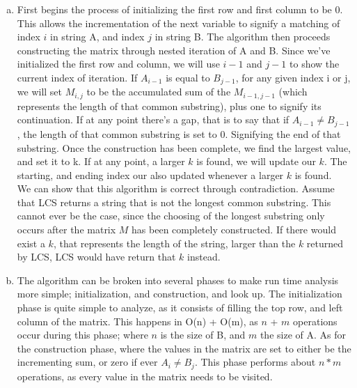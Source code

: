 \documentclass[10pt]{article}
\begin{document}
\begin{question}
\begin{enumerate}[a)]
        \item %
        First begins the process of initializing the first row and first column to be 0. This allows the incrementation of the next variable to signify a matching of index $i$ in string A, and index $j$ in string B.
        \newline \newlie
        The algorithm then proceeds constructing the matrix through nested iteration of A and B. Since we've initialized the first row and column, we will use $i-1$ and $j-1$ to show the current index of iteration. If $A_{i-1}$ is equal to $B_{j-1}$, for any given index i or j, we will set $M_{i,j}$ to be the accumulated sum of the $M_{i-1, j-1}$ (which represents the length of that common substring), plus one to signify its continuation. If at any point there's a gap, that is to say that if $A_{i-1} \neq B_{j-1}$, the length of that common substring is set to 0. Signifying the end of that substring.
        \newline \newline
        Once the construction has been complete, we find the largest value, and set it to k. If at any point, a larger $k$ is found, we will update our $k$. The starting, and ending index our also updated whenever a larger $k$ is found. \
        \newline \newline
        We can show that this algorithm is correct through contradiction. 
        Assume that LCS returns a string that is not the longest common substring. This cannot ever be the case, since the choosing of the longest substring only occurs after the matrix $M$ has been completely constructed. If there would exist a $k$, that represents the length of the string, larger than the $k$ returned by LCS, LCS would have return that $k$ instead.
        \item %
        The algorithm can be broken into several phases to make run time analysis more simple; initialization, and construction, and look up. The initialization phase is quite simple to analyze, as it consists of filling the top row, and left column of the matrix. This happens in O(n) + O(m), as $n$ + $m$ operations occur during this phase; where $n$ is the size of B, and $m$ the size of A. \newline \newline
        As for the construction phase, where the values in the matrix are set to either be the incrementing sum, or zero if ever $A_i \neq B_j$. This phase performs about $n*m$ operations, as every value in the matrix needs to be visited. \newline \newline

\end{enumerate}
\end{question}
\end{document}
